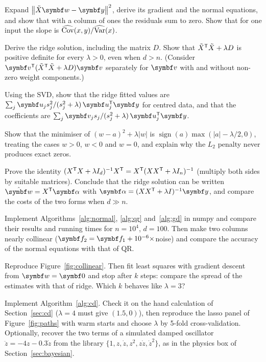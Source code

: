 \documentclass[11pt]{article}
\newcommand{\Xt}{\tilde X}
\newcommand{\w}{\vect{w}}
\newcommand{\y}{\vect{y}}
\newcommand{\Ic}{D}
\begin{document}
\begin{questions}
\begin{derivations}
\item Expand $\norm{\Xt\w - \y}^2$, derive its gradient and the normal equations, and show that with a column of ones the
residuals sum to zero. Show that for one input the slope is $\widehat{\operatorname{Cov}}(x, y)/\widehat{\operatorname{Var}}(x)$.
\item Derive the ridge solution, including the matrix $\Ic$. Show that $\Xt\T\Xt + \lambda\Ic$ is positive definite
for every $\lambda > 0$, even when $d > n$. (Consider $\vect{v}\T(\Xt\T\Xt + \lambda\Ic)\vect{v}$ separately for $\vect{v}$ with
and without non-zero weight components.)
\item Using the SVD, show that the ridge fitted values are $\sum_j \vect{u}_j s_j^2/(s_j^2 + \lambda)\, \vect{u}_j\T\y$ for
centred data, and that the coefficients are $\sum_j \vect{v}_j s_j/(s_j^2 + \lambda)\,\vect{u}_j\T\y$.
\item Show that the minimiser of $(w - a)^2 + \lambda|w|$ is $\operatorname{sign}(a)\max(|a| - \lambda/2, 0)$, treating the
cases $w > 0$, $w < 0$ and $w = 0$, and explain why the $L_2$ penalty never produces exact zeros.
\item Prove the identity $(X^{\mathsf{T}} X + \lambda I_d)^{-1}X^{\mathsf{T}} = X^{\mathsf{T}}(XX^{\mathsf{T}} + \lambda I_n)^{-1}$ (multiply both sides by suitable
matrices). Conclude that the ridge solution can be written $\hat{\w} = X\T\vect{\alpha}$ with
$\vect{\alpha} = (XX\T + \lambda I)^{-1}\y$, and compare the costs of the two forms when $d \gg n$.
\end{derivations}

\begin{programming}
\item Implement Algorithms~\ref{alg:normal}, \ref{alg:qr} and~\ref{alg:gd} in numpy and compare their results and
running times for $n = 10^4$, $d = 100$. Then make two columns nearly collinear ($\vect{f}_2 = \vect{f}_1 + 10^{-6}\times$noise) and
compare the accuracy of the normal equations with that of QR.
\item Reproduce Figure~\ref{fig:collinear}. Then fit least squares with gradient descent from $\w = \vect{0}$ and stop after
$k$ steps: compare the spread of the estimates with that of ridge. Which $k$ behaves like $\lambda = 3$?
\item Implement Algorithm~\ref{alg:cd}. Check it on the hand calculation of Section~\ref{sec:cd} ($\lambda = 4$ must give $(1.5, 0)$), then
reproduce the lasso panel of Figure~\ref{fig:paths} with warm starts and choose $\lambda$ by 5-fold cross-validation.
Optionally, recover the two terms of a simulated damped oscillator $\ddot z = -4z - 0.3\dot z$ from the library
$\{1, z, \dot z, z^2, z\dot z, \dot z^2\}$, as in the physics box of Section~\ref{sec:bayesian}.
\end{programming}
\end{questions}
\end{document}

